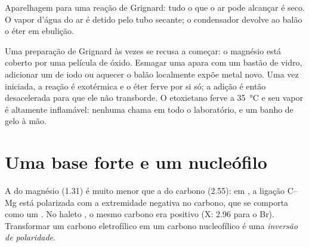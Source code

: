 \begin{omfigure}

{\small Aparelhagem para uma reação de Grignard: tudo o que o ar pode
alcançar é seco. O vapor d'água do ar é detido pelo tubo secante; o
condensador devolve ao balão o éter em ebulição.}
\end{omfigure}

\begin{inthelab}
Uma preparação de Grignard às vezes se recusa a começar: o magnésio está
coberto por uma película de óxido. Esmagar uma apara com um bastão de
vidro, adicionar um  de iodo ou aquecer o balão localmente expõe
metal novo. Uma vez iniciada, a reação é exotérmica e o éter ferve por
si só; a adição é então desacelerada para que ele não transborde. O
etoxietano ferve a \qty{35}{\celsius} e seu vapor é altamente
inflamável: nenhuma chama em todo o laboratório, e um banho de gelo à
mão.
\end{inthelab}

\section{Uma base forte e um nucleófilo}

\begin{definition}\label{def:b1:organomagnesium:umpolung}
A  do magnésio (1.31) é muito menor que a do carbono
(2.55): em , a ligação C--Mg está polarizada com a
extremidade negativa no carbono, que se comporta como um . No
haleto , o mesmo carbono era positivo (X: 2.96 para o Br).
Transformar um carbono eletrofílico em um carbono nucleofílico é uma
\emph{inversão de polaridade}.
\end{definition}

